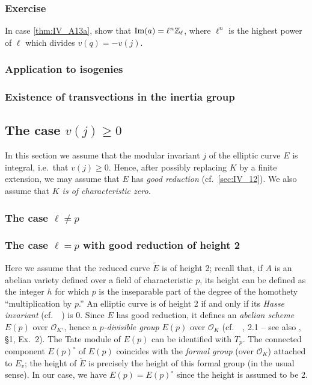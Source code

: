 \begin{subappendices}
\subsubsection*{Exercise}
In case \ref{thm:IV_A13a}, show that $\operatorname{Im}(a) = \ell^n \mathbb{Z}_\ell$, where $\ell^n$
is the highest power of $\ell$ which divides $v(q) = -v(j)$.

\subsubsection{Application to isogenies}
\label{sec:IV_A14}

\subsubsection{Existence of transvections in the inertia group}
\label{sec:IV_A15}

\subsection{The case \texorpdfstring{$v(j) \ge 0$}{v(j) ≥ 0}}
\label{sec:IV_A2}
In this section we assume that the modular invariant $j$ of the elliptic curve
$E$ is integral, i.e.\ that $v(j) \ge 0$. Hence, after possibly replacing $K$
by a finite extension, we may assume that $E$ has \emph{good reduction} (cf.\
\ref{sec:IV_12}). We also assume that \emph{$K$ is of characteristic zero.}

\subsubsection{The case \texorpdfstring{$\ell \ne p$}{ℓ ̸/= p}}
\label{sec:IV_A21}

\subsubsection{The case \texorpdfstring{$\ell = p$}{ℓ = p} with good
reduction of height 2}
\label{sec:IV_A22}
Here we assume that the reduced curve $\widetilde{E}$ is of height 2; recall
that, if $A$ is an abelian variety defined over a field of characteristic $p$,
its height can be defined as the integer $h$ for which $p$ is the inseparable
part of the degree of the homothety ``multiplication by $p$.'' An elliptic
curve is of height 2 if and only if its \emph{Hasse invariant} (cf.\
\citeauthor{9}~\cite{9}) is 0. Since $E$ has good reduction, it defines an
\emph{abelian scheme} $E(p)$ over $\mathcal{O}_{K'}$, hence a
\emph{$p$-divisible group} $E(p)$ over $\mathcal{O}_K$ (cf.\
\citeauthor{39}~\cite{39}, 2.1 -- see also \cite{26}, \S1, Ex.~2).  The Tate
module of $E(p)$ can be identified with $T_p$. The connected component
$E(p)^\circ$ of $E(p)$ coincides with the \emph{formal group} (over
$\mathcal{O}_K$) attached to $E_v$; the height of $\widetilde{E}$ is precisely
the height of this formal group (in the usual sense). In our case, we have
$E(p) = E(p)^\circ$ since the height is assumed to be 2.


\end{subappendices}
